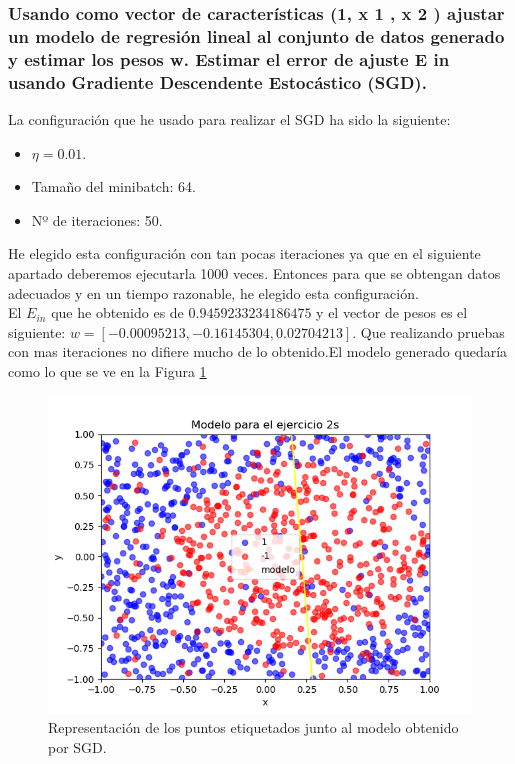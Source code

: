 \documentclass[12pt,a4paper]{article}
\begin{document}
\subsubsection{Usando como vector de características (1, x 1 , x 2 ) ajustar un modelo de regresión 	lineal al conjunto de datos generado y estimar los pesos w. Estimar el error de 	ajuste E in usando Gradiente Descendente Estocástico (SGD).}
La configuración que he usado para realizar el SGD ha sido la siguiente:
\begin{itemize}
	\item $\eta=0.01$.
	\item Tamaño del minibatch: 64.
	\item Nº de iteraciones: 50. 
\end{itemize}
He elegido esta configuración con tan pocas iteraciones ya que en el siguiente apartado deberemos ejecutarla 1000 veces. Entonces para que se obtengan datos adecuados y en un tiempo razonable, he elegido esta configuración.\\
El $E_{in}$ que he obtenido es de $0.9459233234186475$ y el vector de pesos es el siguiente: $w = [-0.00095213, -0.16145304,  0.02704213]$. Que realizando pruebas con mas iteraciones no difiere mucho de lo obtenido.El modelo generado quedaría como lo que se ve en la Figura \ref{pic:regresion}
\begin{figure}[H]  %
	
	\centering
	\includegraphics[width=0.7\textheight]{images/regresion.png}  %
	\caption{Representación de los puntos etiquetados junto al modelo obtenido por SGD.}
	\label{pic:regresion}
\end{figure}
\end{document}
